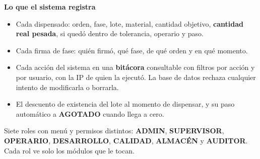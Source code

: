 \documentclass[11pt,letterpaper]{article}
\begin{document}
\vspace{8pt}

\noindent\textbf{\color{azulcom}Lo que el sistema registra}
\begin{itemize}[leftmargin=16pt, itemsep=4pt, topsep=4pt]
    \item Cada dispensado: orden, fase, lote, material, cantidad objetivo, \textbf{cantidad real pesada}, si quedó dentro de tolerancia, operario y paso.
    \item Cada firma de fase: quién firmó, qué fase, de qué orden y en qué momento.
    \item Cada acción del sistema en una \textbf{bitácora} consultable con filtros por acción y por usuario, con la IP de quien la ejecutó. La base de datos rechaza cualquier intento de modificarla o borrarla.
    \item El descuento de existencia del lote al momento de dispensar, y su paso automático a \textbf{AGOTADO} cuando llega a cero.
\end{itemize}

\vspace{14pt}


\noindent Siete roles con menú y permisos distintos: \textbf{ADMIN}, \textbf{SUPERVISOR}, \textbf{OPERARIO}, \textbf{DESARROLLO}, \textbf{CALIDAD}, \textbf{ALMACÉN} y \textbf{AUDITOR}. Cada rol ve solo los módulos que le tocan.

\vspace{8pt}
\end{document}
